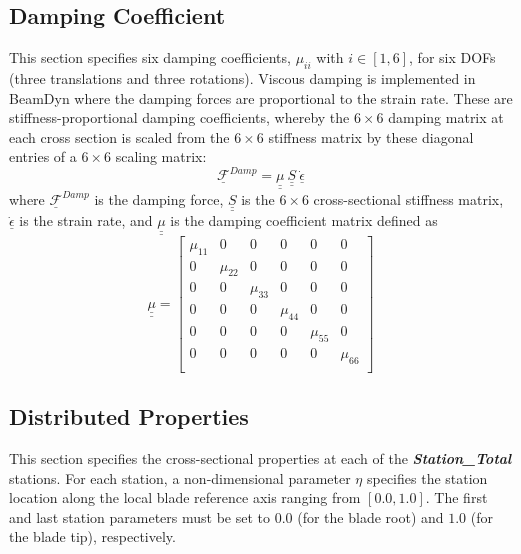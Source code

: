 \subsection{Damping Coefficient}

This section specifies six damping coefficients, $\mu_{ii}$ with $i \in [1,6]$, for six DOFs (three translations and three rotations). 
Viscous damping is implemented in BeamDyn where the damping forces are proportional to the strain rate. 
These are stiffness-proportional damping coefficients, whereby the $6\times6$ damping matrix at each cross section is scaled from the $6 \times 6$ stiffness matrix by these diagonal entries of a $6 \times 6$ scaling matrix:
\begin{equation}
    \label{DampingForce}
    \mathcal{\underline{F}}^{Damp} = \underline{\underline{\mu}}~\underline{\underline{S}}~\dot{\underline{\epsilon}} 
\end{equation}
where $\mathcal{\underline{F}}^{Damp}$ is the damping force, $\underline{\underline{S}}$ is the $ 6 \times 6$ cross-sectional stiffness matrix, $\dot{\underline{\epsilon}} $ is the strain rate, and $\underline{\underline{\mu}}$ is the damping coefficient matrix defined as
\begin{equation}
   \label{DampMatrix}
   \underline{\underline{\mu}} = 
   \begin{bmatrix}
       \mu_{11} & 0 & 0 & 0 & 0 & 0 \\
       0 & \mu_{22} & 0 & 0 & 0 & 0 \\
       0 & 0 & \mu_{33} & 0 & 0 & 0 \\
       0 & 0 & 0 & \mu_{44} & 0 & 0 \\
       0 & 0 & 0 & 0 & \mu_{55} & 0 \\
       0 & 0 & 0 & 0 & 0 & \mu_{66} \\
   \end{bmatrix}
\end{equation}

\subsection{Distributed Properties}

This section specifies the cross-sectional properties at each of the \textbf{\textit{Station\_Total}} stations. 
For each station, a non-dimensional parameter $\eta$ specifies the station location along the local blade reference axis ranging from $[0.0,1.0]$. 
The first and last station parameters must be set to $0.0$ (for the blade root) and $1.0$ (for the blade tip), respectively.

